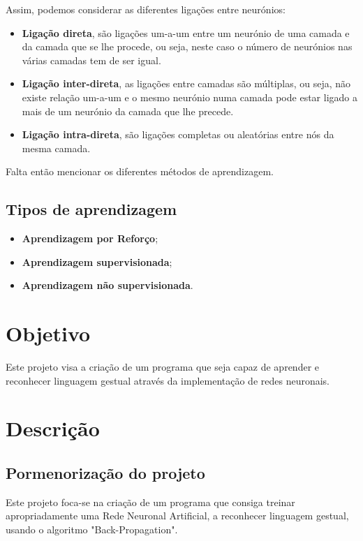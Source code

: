 \documentclass[10pt,a4paper]{article}
\begin{document}
Assim, podemos considerar as diferentes ligações entre neurónios:
\begin{itemize}
\item \textbf{Ligação direta}, são ligações um-a-um entre um neurónio de uma camada e da camada que se lhe procede, ou seja, neste caso o número de neurónios nas várias camadas tem de ser igual.
\item \textbf{Ligação inter-direta}, as ligações entre camadas são múltiplas, ou seja, não existe relação um-a-um e o mesmo neurónio numa camada pode estar ligado a mais de um neurónio da camada que lhe precede.
\item \textbf{Ligação intra-direta}, são ligações completas ou aleatórias entre nós da mesma camada.
\end{itemize}

Falta então mencionar os diferentes métodos de aprendizagem.

\subsection{Tipos de aprendizagem}
\begin{itemize}
\item \textbf{Aprendizagem por Reforço};
\item \textbf{Aprendizagem supervisionada};
\item \textbf{Aprendizagem não supervisionada}.
\end{itemize}
\section{Objetivo}
\subitem

Este projeto visa a criação de um programa que seja capaz de aprender e reconhecer linguagem gestual através da implementação de redes neuronais.

\section{Descrição}

\subsection{Pormenorização do projeto}
\subitem

Este projeto foca-se na criação de um programa que consiga treinar apropriadamente uma Rede Neuronal Artificial, a reconhecer linguagem gestual, usando o algoritmo "Back-Propagation". 
\end{document}
